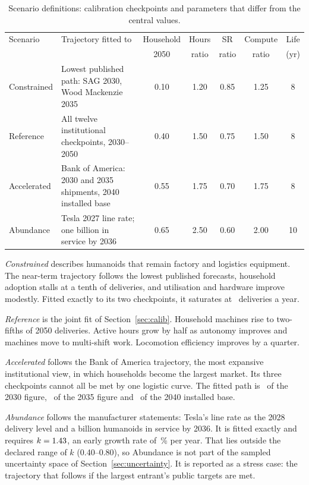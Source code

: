 \documentclass[11pt]{article}
\newcommand{\secref}[1]{Section~\ref{#1}}
\begin{document}
\begin{table}[t]
\centering\small
\caption{Scenario definitions: calibration checkpoints and parameters that differ from the central values.}
\label{tab:scendef}
\begin{tabularx}{\linewidth}{@{}l X c c c c c@{}}
\toprule
Scenario & Trajectory fitted to & Household & Hours & SR & Compute & Life \\
 & & 2050 & ratio & ratio & ratio & (yr) \\
\midrule
Constrained & Lowest published path: SAG 2030, Wood Mackenzie 2035 & 0.10 & 1.20 & 0.85 & 1.25 & 8 \\
Reference & All twelve institutional checkpoints, 2030--2050 & 0.40 & 1.50 & 0.75 & 1.50 & 8 \\
Accelerated & Bank of America: 2030 and 2035 shipments, 2040 installed base & 0.55 & 1.75 & 0.70 & 1.75 & 8 \\
Abundance & Tesla 2027 line rate; one billion in service by 2036 & 0.65 & 2.50 & 0.60 & 2.00 & 10 \\
\bottomrule
\end{tabularx}
\end{table}

\emph{Constrained} describes humanoids that remain factory and logistics equipment. The near-term trajectory follows the lowest published forecasts, household adoption stalls at a tenth of deliveries, and utilisation and hardware improve modestly. Fitted exactly to its two checkpoints, it saturates at \ConQmax\ deliveries a year.

\emph{Reference} is the joint fit of \secref{sec:calib}. Household machines rise to two-fifths of 2050 deliveries. Active hours grow by half as autonomy improves and machines move to multi-shift work. Locomotion efficiency improves by a quarter.

\emph{Accelerated} follows the Bank of America trajectory, the most expansive institutional view, in which households become the largest market. Its three checkpoints cannot all be met by one logistic curve. The fitted path is \AccBofAThirty\ of the 2030 figure, \AccBofAThirtyFive\ of the 2035 figure and \AccBofASForty\ of the 2040 installed base.

\emph{Abundance} follows the manufacturer statements: Tesla's line rate as the 2028 delivery level and a billion humanoids in service by 2036. It is fitted exactly and requires $k=1.43$, an early growth rate of \Abukpct\,\% per year. That lies outside the declared range of $k$ (0.40--0.80), so Abundance is not part of the sampled uncertainty space of \secref{sec:uncertainty}. It is reported as a stress case: the trajectory that follows if the largest entrant's public targets are met.
\end{document}
